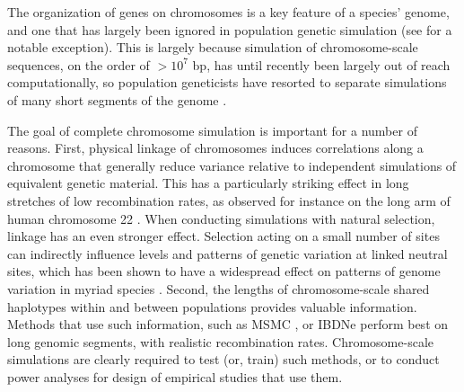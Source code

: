 \documentclass[hidelinks]{article}
\begin{document}
The organization of genes on chromosomes is a key feature of a species' genome,
and one that has largely been ignored in population genetic simulation (see \cite{schrider2020background} for a notable exception).
This is largely because simulation of chromosome-scale sequences, on the order of $ > 10^7$ bp,
has until recently been largely out of reach computationally, 
so population geneticists have resorted to separate simulations of many short segments
of the genome \citep[e.g.,][]{harris2016genetic}.

The goal of complete chromosome simulation is important for a number of reasons.
First, physical linkage of chromosomes induces correlations along a chromosome that
generally reduce variance relative to independent simulations of equivalent genetic material.
This has a particularly striking effect in long stretches of low recombination rates,
as observed for instance on the long arm of human chromosome 22 \citep{Dawson2002}.
When conducting simulations with natural selection, linkage has
an even stronger effect. Selection acting on a small number of sites can
indirectly influence levels and patterns of genetic variation at linked neutral sites,
which has been shown to have a widespread
effect on patterns of genome variation in myriad species
\citep[e.g.,][]{McVicker2009,Charlesworth2012}. 
Second, the lengths of chromosome-scale shared haplotypes within and
between populations provides valuable information.
Methods that use such information, such as MSMC \citep{Schiffels2020},
or IBDNe \citep{browning2015accurate} %
perform best on long genomic segments, with realistic recombination rates.
Chromosome-scale simulations are clearly required to test (or, train) such methods,
or to conduct power analyses for design of empirical studies that use them.


%
\end{document}
